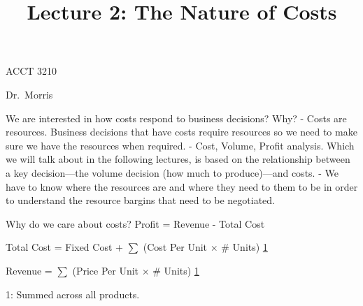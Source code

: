 \documentclass[
  ignorenonframetext,
]{beamer}
\title{Lecture 2: The Nature of Costs}
\author{}
\date{}
\begin{document}
\frame{\titlepage}


\begin{frame}
\begin{block}{ACCT 3210}
\label{acct-3210}
\begin{block}{Dr.~Morris}
\label{dr.-morris}
\end{block}
\end{block}
\end{frame}

\begin{frame}
We are interested in how costs respond to business decisions? Why? -
Costs are resources. Business decisions that have costs require
resources so we need to make sure we have the resources when required. -
Cost, Volume, Profit analysis. Which we will talk about in the following
lectures, is based on the relationship between a key decision---the
volume decision (how much to produce)---and costs. - We have to know
where the resources are and where they need to them to be in order to
understand the resource bargins that need to be negotiated.
\end{frame}

\begin{frame}
\begin{block}{Why do we care about costs?}
\label{why-do-we-care-about-costs}
Profit = Revenue - Total Cost

Total Cost = Fixed Cost + \(\sum\) (Cost Per Unit \(\times\) \# Units)
\hyperlink{fn1}{1}

Revenue = \(\sum\) (Price Per Unit \(\times\) \# Units)
\hyperlink{fn1}{1}

1: Summed across all products.
\end{block}
\end{frame}
\end{document}
